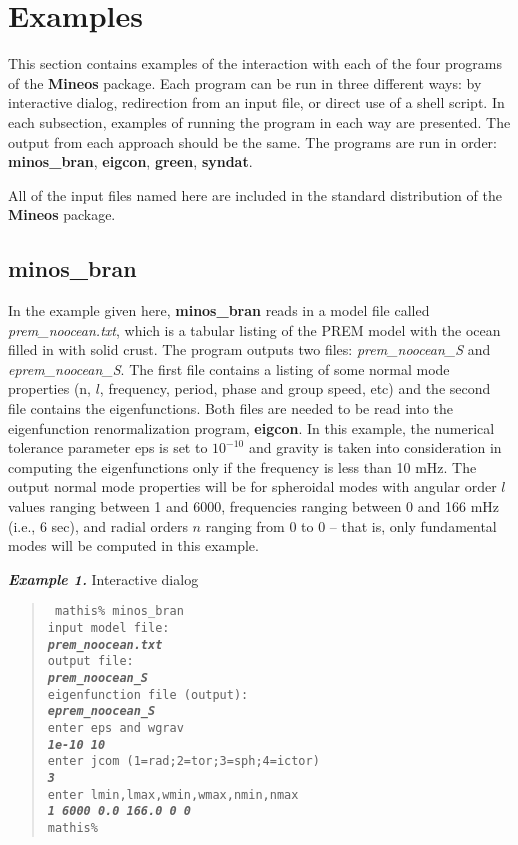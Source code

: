 %
%
\section{Examples}

This section contains examples of the interaction with each of the
four programs of the {\bf Mineos} package. Each program can be
run in three different ways: by interactive dialog, redirection from 
an input file, or direct use of a shell script. In each subsection,
examples of running the program in each way are presented. The output
from each approach should be the same. The programs are run in order:
{\bf minos\_bran}, {\bf eigcon}, {\bf green}, {\bf syndat}.

All of the input files named here are included in the standard distribution
of the {\bf Mineos} package.

\subsection{minos\_bran}

In the example given here, {\bf minos\_bran} reads in a model file
called {\it prem\_noocean.txt}, which is a tabular listing of the
PREM model with the ocean filled in with solid crust. The program 
outputs two files: {\it prem\_noocean\_S} and {\it eprem\_noocean\_S}.
The first file contains a listing of some normal mode properties (n, $l$,
frequency, period, phase and group speed, etc) and the second file
contains the eigenfunctions. Both files are needed to be read into 
the eigenfunction renormalization program, {\bf eigcon}. In this example,
the numerical tolerance parameter eps is set to $10^{-10}$ and gravity is taken
into consideration in computing the eigenfunctions only if the frequency
is less than 10 mHz. The  output normal mode properties will be
for spheroidal modes with angular order $l$ values ranging between 1 and 6000, frequencies
ranging between 0 and 166 mHz (i.e., 6 sec), and  radial orders $n$ ranging from 0
to 0 -- that is, only fundamental modes will be computed in this example.

{\bf\emph{Example 1.}} Interactive dialog
\begin{quote}
\texttt{ mathis\% minos\_bran \\ 
input model file: \\
{\bf \emph{prem\_noocean.txt}} \\
output file: \\
{\bf \emph{prem\_noocean\_S}} \\
eigenfunction file (output): \\
{\bf \emph{eprem\_noocean\_S}} \\
enter eps and wgrav \\
{\bf \emph{1e-10 10}} \\
enter jcom (1=rad;2=tor;3=sph;4=ictor) \\
{\bf \emph{3}} \\
enter lmin,lmax,wmin,wmax,nmin,nmax \\
{\bf \emph{1 6000 0.0 166.0 0 0}} \\
mathis\%  }
\end{quote}

